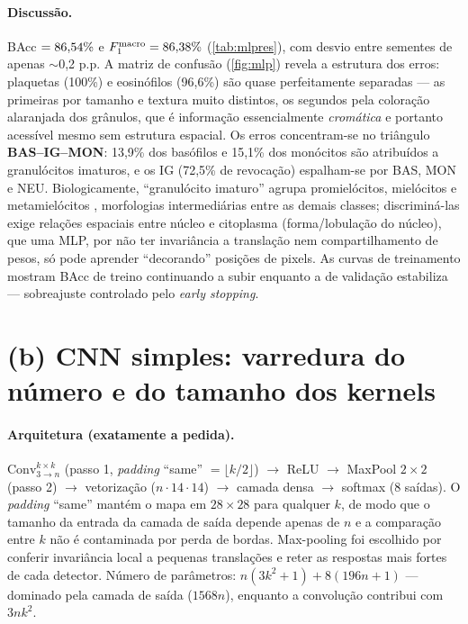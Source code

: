 \documentclass[10pt,a4paper]{article}
\newcommand{\Fmac}{F_1^{\mathrm{macro}}}
\begin{document}
\paragraph{Discussão.} BAcc $=86{,}54\%$ e $\Fmac=\mlpFone\%$ (\cref{tab:mlpres}), com desvio entre
sementes de apenas $\sim$0,2 p.p. A matriz de confusão (\cref{fig:mlp}) revela a estrutura dos erros:
plaquetas (100\%) e eosinófilos (96,6\%) são quase perfeitamente separadas --- as primeiras por tamanho e
textura muito distintos, os segundos pela coloração alaranjada dos grânulos, que é informação essencialmente
\emph{cromática} e portanto acessível mesmo sem estrutura espacial. Os erros concentram-se no triângulo
\textbf{BAS--IG--MON}: 13,9\% dos basófilos e 15,1\% dos monócitos são atribuídos a granulócitos imaturos, e
os IG (72,5\% de revocação) espalham-se por BAS, MON e NEU. Biologicamente, ``granulócito imaturo'' agrupa
promielócitos, mielócitos e metamielócitos \cite{acevedo2020}, morfologias intermediárias entre as demais
classes; discriminá-las exige relações espaciais entre núcleo e citoplasma (forma/lobulação do núcleo), que
uma MLP, por não ter invariância a translação nem compartilhamento de pesos, só pode aprender
``decorando'' posições de pixels. As curvas de treinamento mostram BAcc de treino continuando a subir enquanto
a de validação estabiliza --- sobreajuste controlado pelo \emph{early stopping}.

\section{(b) CNN simples: varredura do número e do tamanho dos kernels}\label{sec:cnnb}
\paragraph{Arquitetura (exatamente a pedida).}
$\mathrm{Conv}_{3\to n}^{k\times k}$ (passo 1, \emph{padding} ``same'' $=\lfloor k/2\rfloor$) $\to$ ReLU $\to$
MaxPool $2\times2$ (passo 2) $\to$ vetorização ($n\cdot14\cdot14$) $\to$ camada densa $\to$ softmax (8 saídas).
O \emph{padding} ``same'' mantém o mapa em $28\times28$ para qualquer $k$, de modo que o tamanho da entrada da
camada de saída depende apenas de $n$ e a comparação entre $k$ não é contaminada por perda de bordas.
Max-pooling foi escolhido por conferir invariância local a pequenas translações e reter as respostas mais
fortes de cada detector. Número de parâmetros: $n(3k^2+1)+8(196n+1)$ --- dominado pela camada de saída
($1568n$), enquanto a convolução contribui com $3nk^2$.
\end{document}
